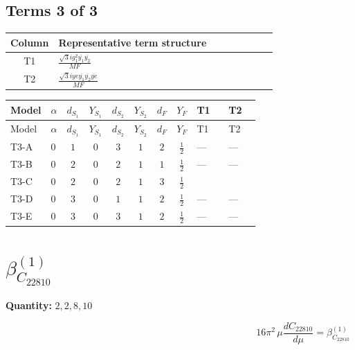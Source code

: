 \documentclass[8pt]{article}
\begin{document}
\begin{landscape}
\subsection*{Terms 3 of 3}
\begin{center}
\begin{tabular}{@{}c >{\raggedright\arraybackslash}p{0.82\linewidth}@{}}
\toprule
Column & Representative term structure \\
\midrule
T1 & \(\displaystyle \frac{\sqrt{3} i g_{1}^{2} \overline{y_{1}} \overline{y_{2}}}{MF}\) \\
\midrule
T2 & \(\displaystyle \frac{\sqrt{3} i ye \overline{y_{1}} \overline{y_{2}} \overline{ye}}{MF}\) \\
\midrule
\bottomrule
\end{tabular}
\end{center}
\smallskip
\tiny
\begin{longtable}{@{}llcccccc >{\raggedright\arraybackslash}p{0.21\linewidth} >{\raggedright\arraybackslash}p{0.21\linewidth}@{}}
\toprule
Model & $\alpha$ & $d_{S_1}$ & $Y_{S_1}$ & $d_{S_2}$ & $Y_{S_2}$ & $d_F$ & $Y_F$ & T1 & T2 \\
\midrule
\endfirsthead
\toprule
Model & $\alpha$ & $d_{S_1}$ & $Y_{S_1}$ & $d_{S_2}$ & $Y_{S_2}$ & $d_F$ & $Y_F$ & T1 & T2 \\
\midrule
\endhead
T3-A & $0$ & $1$ & $0$ & $3$ & $1$ & $2$ & $\frac{1}{2}$ & --- & --- \\
\midrule
T3-B & $0$ & $2$ & $0$ & $2$ & $1$ & $1$ & $\frac{1}{2}$ & --- & --- \\
\midrule
T3-C & $0$ & $2$ & $0$ & $2$ & $1$ & $3$ & $\frac{1}{2}$ & \scriptsize\adjustbox{max width=\linewidth}{$\begin{gathered} \frac{\sqrt{3} i g_{1}^{2} \overline{y_{1}} \overline{y_{2}}}{8 MF}\end{gathered}$} & \scriptsize\adjustbox{max width=\linewidth}{$\begin{gathered} - \frac{\sqrt{3} i ye \overline{y_{1}} \overline{y_{2}} \overline{ye}}{12 MF}\end{gathered}$} \\
\midrule
T3-D & $0$ & $3$ & $0$ & $1$ & $1$ & $2$ & $\frac{1}{2}$ & --- & --- \\
\midrule
T3-E & $0$ & $3$ & $0$ & $3$ & $1$ & $2$ & $\frac{1}{2}$ & --- & --- \\
\midrule
\bottomrule
\end{longtable}
\clearpage
\section*{$\beta_{C_{22810}}^{(1)}$}
\noindent\textbf{Quantity: }$\mathrm{2,2,8,10}$\par\smallskip
\[16\pi^2\,\mu\frac{d C_{22810}}{d\mu}=\beta_{C_{22810}}^{(1)}\]

\end{landscape}
\end{document}
